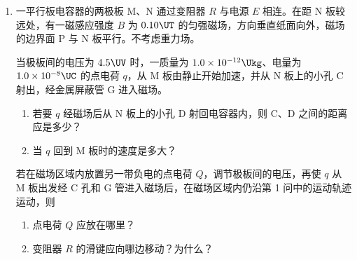 \documentclass[\gkver]{gaokaozhenti}
\begin{document}
\begin{enumerate}


\item
一平行板电容器的两极板 M、N 通过变阻器 $R$ 与电源 $E$ 相连。在距 N 板较远处，有一磁感应强度 $B$ 为 $0.10\UT$ 的匀强磁场，方向垂直纸面向外，磁场的边界面 P 与 N 板平行。不考虑重力场。

当极板间的电压为 $4.5\UV$ 时，一质量为 $1.0\times10^{-12}\Ukg$、电量为 $1.0\times10^{-8}\UC$ 的点电荷 $q$，从 M 板由静止开始加速，并从 N 板上的小孔 C 射出，经金属屏蔽管 G 进入磁场。
\begin{enumerate}
	\item
	若要 $q$ 经磁场后从 N 板上的小孔 D 射回电容器内，则 C、D 之间的距离应是多少？

	\item
	当 $q$ 回到 M 板时的速度是多大？
\end{enumerate}

若在磁场区域内放置另一带负电的点电荷 $Q$，调节极板间的电压，再使 $q$ 从 M 板出发经 C 孔和 G 管进入磁场后，在磁场区域内仍沿第 1 问中的运动轨迹运动，则
\begin{enumerate}
	\item
	点电荷 $Q$ 应放在哪里？

	\item
	变阻器 $R$ 的滑键应向哪边移动？为什么？
\end{enumerate}
\onepicture[align=right, h=7.52cm]{}

\end{enumerate}
\end{document}
